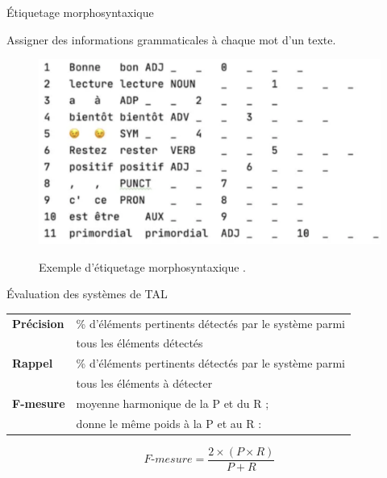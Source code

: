 \documentclass[xetex,xcolor={table,usenames,dvipsnames}]{beamer}
\newcommand{\bolder}[1]{{\color{purple}\bfseries#1}}
\begin{document}
\begin{frame}{Étiquetage morphosyntaxique}
	\begin{block}{\vspace{-6mm}}
		\justifying
		Assigner des informations grammaticales à chaque mot d’un texte.
	\end{block}
			\begin{figure}[h] %
		\centering
		\includegraphics[width=0.80\linewidth]{img/etiquetage.png}
		\label{fig:etiquetage}
		\caption{Exemple d'étiquetage morphosyntaxique \citep{wang2021}.}
	\end{figure}
\end{frame}

\begin{frame}{Évaluation des systèmes de \textsc{TAL}}
	\begin{table}[h]
		\begin{tabular}{ll}
			\bolder{\textbf{P}récision} & \% d'éléments pertinents détectés par le système parmi\\ & tous les éléments détectés\\
			\bolder{\textbf{R}appel} & \% d'éléments pertinents détectés par le système parmi\\ & tous les éléments à détecter\\
			\bolder{\textsc{F}-mesure} & \og{}moyenne harmonique\fg{} de la \textsc{P} et du \textsc{R} ;\\
			& donne le même poids à la \textsc{P} et au \textsc{R} : 
		\end{tabular}
	\end{table}

    \begin{equation*}    %
	F\text{-}mesure = \frac{2 \times (P \times R)}{P + R}
\end{equation*}
\end{frame}
\end{document}
